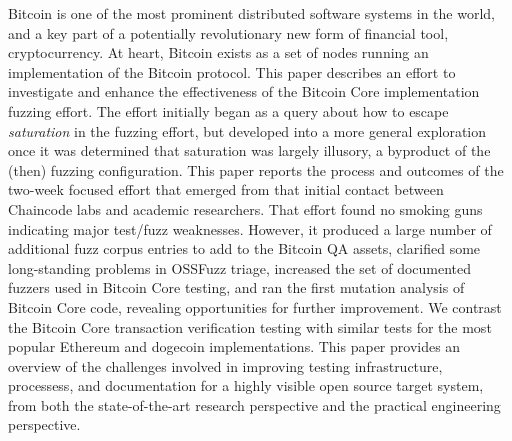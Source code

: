 Bitcoin is one of the most prominent distributed software systems in the world, and a key part of a potentially revolutionary new form of financial tool, cryptocurrency.  At heart, Bitcoin exists as a set of nodes running an implementation of the Bitcoin protocol.  This paper describes an effort to investigate and enhance the effectiveness of the Bitcoin Core implementation fuzzing effort.  The effort initially began as a query about how to escape \emph{saturation} in the fuzzing effort, but developed into a more general exploration once it was determined that saturation was largely illusory, a byproduct of the (then) fuzzing configuration.  This paper reports the process and outcomes of the two-week focused effort that emerged from that initial contact between Chaincode labs and academic researchers.  That effort found no smoking guns indicating major test/fuzz weaknesses. However, it produced a large number of additional fuzz corpus entries to add to the Bitcoin QA assets, clarified some long-standing problems in OSSFuzz triage, increased the set of documented fuzzers used in Bitcoin Core testing, and ran the first mutation analysis of Bitcoin Core code, revealing opportunities for further improvement.  We contrast the Bitcoin Core transaction verification testing with similar tests for the most popular Ethereum and dogecoin implementations.  This paper provides an overview of the challenges involved in improving testing infrastructure, processess, and documentation for a highly visible open source target system, from both the state-of-the-art research perspective and the practical engineering perspective.